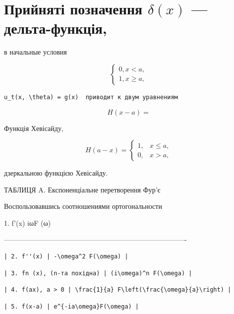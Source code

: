 \documentclass[
  ukrainian,
]{article}
\begin{document}
\section{\texorpdfstring{Прийняті позначення \(\delta\left(x\right)\)
---
дельта-функція,}{Прийняті позначення \textbackslash delta\textbackslash left(x\textbackslash right) --- дельта-функція,}}\label{ux43fux440ux438ux439ux43dux44fux442ux456-ux43fux43eux437ux43dux430ux447ux435ux43dux43dux44f-deltaleftxright-ux434ux435ux43bux44cux442ux430-ux444ux443ux43dux43aux446ux456ux44f}

в начальные условия

\[
\begin{cases} 0, x < a, \\ 1, x \geqslant a, \end{cases}
\]

\begin{verbatim}
u_t(x, \theta) = g(x)  приводит к двум уравнениям
\end{verbatim}

\[
H(x-a) =
\]

Функція Хевісайду,

\[
H(a-x) = \begin{cases} 1, & x \leqslant a, \\ 0, & x > a, \end{cases}
\]

дзеркальною функцією Хевісайду.

ТАБЛИЦЯ A. Експоненціальне перетворення Фур'є

Воспользовавшись соотношениями ортогональности

1. f'(x) \textbar{} iωF (ω) \textbar{}

\textbar------------------------------\textbar-------------------------------------------------\textbar{}

\begin{verbatim}
| 2. f''(x) | -\omega^2 F(\omega) |
\end{verbatim}

\begin{verbatim}
| 3. fn (x), (n-та похідна) | (i\omega)^n F(\omega) |
\end{verbatim}

\begin{verbatim}
| 4. f(ax), a > 0 | \frac{1}{a} F\left(\frac{\omega}{a}\right) |
\end{verbatim}

\begin{verbatim}
| 5. f(x-a) | e^{-ia\omega}F(\omega) |
\end{verbatim}
\end{document}
